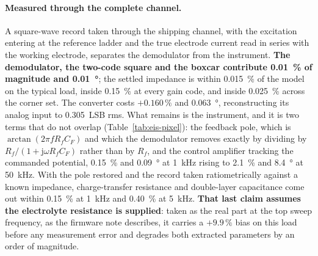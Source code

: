 

\paragraph{Measured through the complete channel.} A square-wave record taken
through the shipping channel, with the excitation entering at the reference
ladder and the true electrode current read in series with the working
electrode, separates the demodulator from the instrument.
\textbf{The demodulator, the two-code square and the boxcar contribute
\SI{0.01}{\percent} of magnitude and \SI{0.01}{\degree}}; the settled
impedance is within \SI{0.015}{\percent} of the model on the typical load,
inside \SI{0.15}{\percent} at every gain code, and inside
\SI{0.025}{\percent} across the corner set. The converter costs
\(+0.160\,\%\) and \SI{0.063}{\degree}, reconstructing its analog
input to \SI{0.305}{LSB} rms. What remains is the instrument, and it is two
terms that do not overlap (Table~\ref{tab:eis-pixel}): the feedback pole, which
is \(\arctan(2\pi f R_f C_F)\) and which the demodulator removes exactly by
dividing by \(R_f/(1 + \mathrm{j}\omega R_f C_F)\) rather than by \(R_f\),
and the control amplifier tracking the commanded potential, \SI{0.15}{\percent}
and \SI{0.09}{\degree} at \SI{1}{\kilo\hertz} rising to \SI{2.1}{\percent}
and \SI{8.4}{\degree} at \SI{50}{\kilo\hertz}. With the pole restored and the
record taken ratiometrically against a known impedance, charge-transfer
resistance and double-layer capacitance come out within
\SI{0.15}{\percent} at \SI{1}{\kilo\hertz} and \SI{0.40}{\percent} at
\SI{5}{\kilo\hertz}. \textbf{That last claim assumes the electrolyte
resistance is supplied}: taken as the real part at the top sweep frequency, as
the firmware note describes, it carries a \(+9.9\,\%\) bias on this load
before any measurement error and degrades both extracted parameters by an order
of magnitude.


